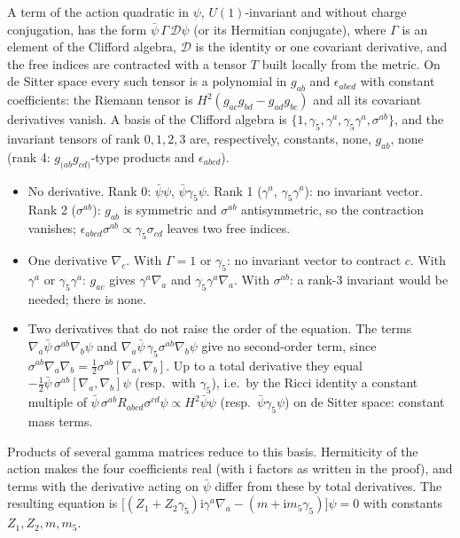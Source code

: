 \documentclass[11pt,a4paper]{article}
\theoremstyle{definition}
\newcommand{\ii}{\mathrm{i}}
\begin{document}
A term of the action quadratic in $\psi$, $U(1)$-invariant and without charge conjugation, has the form $\bar\psi\,\Gamma\,\mathcal{D}\psi$ (or its Hermitian conjugate), where $\Gamma$ is an element of the Clifford algebra, $\mathcal{D}$ is the identity or one covariant derivative, and the free indices are contracted with a tensor $T$ built locally from the metric. On de Sitter space every such tensor is a polynomial in $g_{ab}$ and $\epsilon_{abcd}$ with constant coefficients: the Riemann tensor is $H^{2}(g_{ac}g_{bd}-g_{ad}g_{bc})$ and all its covariant derivatives vanish. A basis of the Clifford algebra is $\{1,\gamma_{5},\gamma^{a},\gamma_{5}\gamma^{a},\sigma^{ab}\}$, and the invariant tensors of rank $0,1,2,3$ are, respectively, constants, none, $g_{ab}$, none (rank 4: $g_{(ab}g_{cd)}$-type products and $\epsilon_{abcd}$).
\begin{itemize}[leftmargin=1.5em]
\item No derivative. Rank 0: $\bar\psi\psi$, $\bar\psi\gamma_{5}\psi$. Rank 1 ($\gamma^{a}$, $\gamma_{5}\gamma^{a}$): no invariant vector. Rank 2 ($\sigma^{ab}$): $g_{ab}$ is symmetric and $\sigma^{ab}$ antisymmetric, so the contraction vanishes; $\epsilon_{abcd}\sigma^{ab}\propto\gamma_{5}\sigma_{cd}$ leaves two free indices.
\item One derivative $\nabla_{c}$. With $\Gamma=1$ or $\gamma_{5}$: no invariant vector to contract $c$. With $\gamma^{a}$ or $\gamma_{5}\gamma^{a}$: $g_{ac}$ gives $\gamma^{a}\nabla_{a}$ and $\gamma_{5}\gamma^{a}\nabla_{a}$. With $\sigma^{ab}$: a rank-3 invariant would be needed; there is none.
\item Two derivatives that do not raise the order of the equation. The terms $\nabla_{a}\bar\psi\,\sigma^{ab}\nabla_{b}\psi$ and $\nabla_{a}\bar\psi\,\gamma_{5}\sigma^{ab}\nabla_{b}\psi$ give no second-order term, since $\sigma^{ab}\nabla_{a}\nabla_{b}=\tfrac12\sigma^{ab}[\nabla_{a},\nabla_{b}]$. Up to a total derivative they equal $-\tfrac12\bar\psi\,\sigma^{ab}[\nabla_{a},\nabla_{b}]\psi$ (resp.\ with $\gamma_{5}$), i.e.\ by the Ricci identity a constant multiple of $\bar\psi\,\sigma^{ab}R_{abcd}\sigma^{cd}\psi\propto H^{2}\bar\psi\psi$ (resp.\ $\bar\psi\gamma_{5}\psi$) on de Sitter space: constant mass terms.
\end{itemize}
Products of several gamma matrices reduce to this basis. Hermiticity of the action makes the four coefficients real (with $\ii$ factors as written in the proof), and terms with the derivative acting on $\bar\psi$ differ from these by total derivatives. The resulting equation is $\big[(Z_{1}+Z_{2}\gamma_{5})\ii\gamma^{a}\nabla_{a}-(m+\ii m_{5}\gamma_{5})\big]\psi=0$ with constants $Z_{1},Z_{2},m,m_{5}$.
\end{document}
